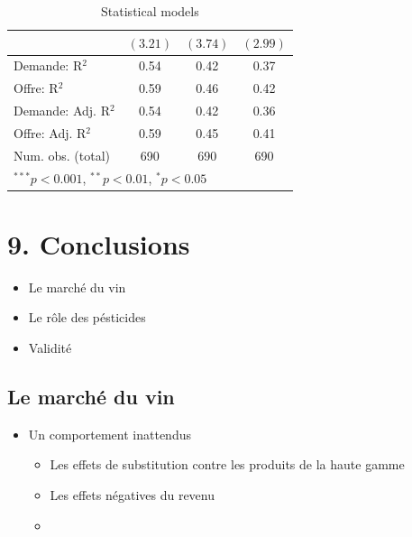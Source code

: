 \documentclass[11pt,]{article}
\providecommand{\tightlist}{%
  \setlength{\itemsep}{0pt}\setlength{\parskip}{0pt}}
\begin{document}
\begin{table}[!htbp]
\begin{center}
\begin{tabular}{l c c c }
                    & $(3.21)$       & $(3.74)$       & $(2.99)$     \\
\hline
Demande: R$^2$      & 0.54           & 0.42           & 0.37         \\
Offre: R$^2$        & 0.59           & 0.46           & 0.42         \\
Demande: Adj. R$^2$ & 0.54           & 0.42           & 0.36         \\
Offre: Adj. R$^2$   & 0.59           & 0.45           & 0.41         \\
Num. obs. (total)   & 690            & 690            & 690          \\
\hline
\multicolumn{4}{l}{\scriptsize{$^{***}p<0.001$, $^{**}p<0.01$, $^*p<0.05$}}
\end{tabular}
\caption{Statistical models}
\label{table : ols, 2sls et 3sls, full information clusters}
\end{center}
\end{table}

\FloatBarrier

\hypertarget{conclusions}{%
\section{9. Conclusions}\label{conclusions}}

\begin{itemize}
\tightlist
\item
  Le marché du vin
\item
  Le rôle des pésticides\\
\item
  Validité
\end{itemize}

\FloatBarrier

\hypertarget{le-marche-du-vin}{%
\subsection{Le marché du vin}\label{le-marche-du-vin}}

\begin{itemize}
\tightlist
\item
  Un comportement inattendus

  \begin{itemize}
  \item
    Les effets de substitution contre les produits de la haute gamme
  \item
    Les effets négatives du revenu
  \item
  \end{itemize}
\end{itemize}
\end{document}
